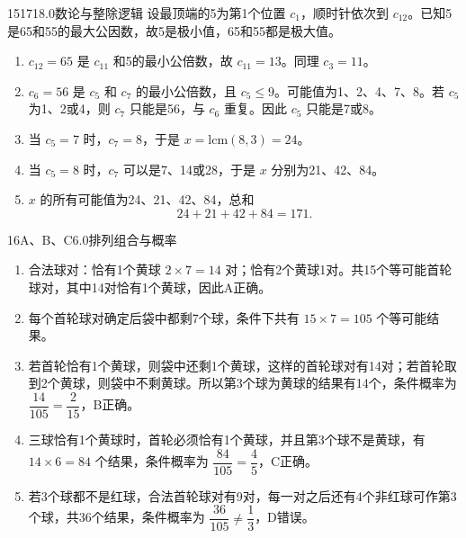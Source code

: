 \begin{solution}{15}{171}{8.0}{数论与整除逻辑}
设最顶端的5为第1个位置 \(c_1\)，顺时针依次到 \(c_{12}\)。已知5是65和55的最大公因数，故5是极小值，65和55都是极大值。
\begin{enumerate}[label=\textbf{Step \arabic*:},leftmargin=*]
\item \(c_{12}=65\) 是 \(c_{11}\) 和5的最小公倍数，故 \(c_{11}=13\)。同理 \(c_3=11\)。
\item \(c_6=56\) 是 \(c_5\) 和 \(c_7\) 的最小公倍数，且 \(c_5\le9\)。可能值为1、2、4、7、8。若 \(c_5\) 为1、2或4，则 \(c_7\) 只能是56，与 \(c_6\) 重复。因此 \(c_5\) 只能是7或8。
\item 当 \(c_5=7\) 时，\(c_7=8\)，于是 \(x=\mathrm{lcm}(8,3)=24\)。
\item 当 \(c_5=8\) 时，\(c_7\) 可以是7、14或28，于是 \(x\) 分别为21、42、84。
\item \(x\) 的所有可能值为24、21、42、84，总和
\[
  24+21+42+84=171.
\]
\end{enumerate}
\end{solution}


\begin{solution}{16}{A、B、C}{6.0}{排列组合与概率}
\begin{enumerate}[label=\textbf{Step \arabic*:},leftmargin=*]
\item 合法球对：恰有1个黄球 \(2\times7=14\) 对；恰有2个黄球1对。共15个等可能首轮球对，其中14对恰有1个黄球，因此A正确。
\item 每个首轮球对确定后袋中都剩7个球，条件下共有 \(15\times7=105\) 个等可能结果。
\item 若首轮恰有1个黄球，则袋中还剩1个黄球，这样的首轮球对有14对；若首轮取到2个黄球，则袋中不剩黄球。所以第3个球为黄球的结果有14个，条件概率为 \(\dfrac{14}{105}=\dfrac{2}{15}\)，B正确。
\item 三球恰有1个黄球时，首轮必须恰有1个黄球，并且第3个球不是黄球，有 \(14\times6=84\) 个结果，条件概率为 \(\dfrac{84}{105}=\dfrac45\)，C正确。
\item 若3个球都不是红球，合法首轮球对有9对，每一对之后还有4个非红球可作第3个球，共36个结果，条件概率为 \(\dfrac{36}{105}\ne\dfrac13\)，D错误。
\end{enumerate}
\end{solution}

